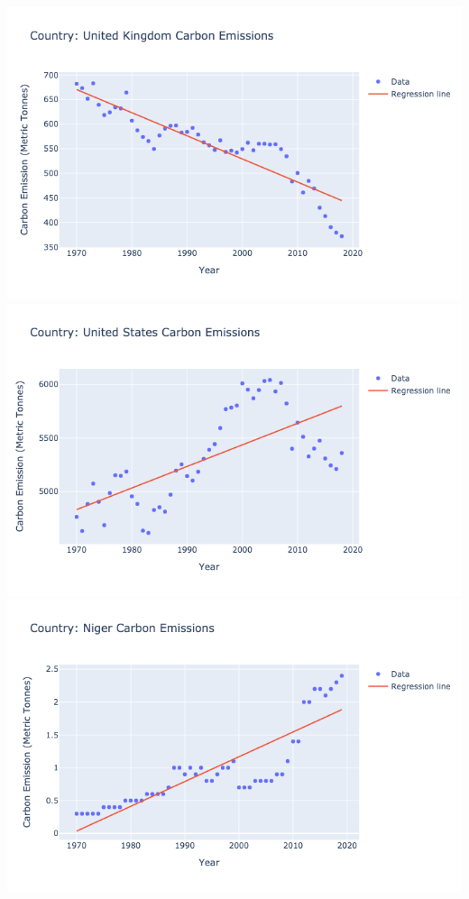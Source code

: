 \documentclass[fontsize=11pt]{article}
\begin{document}
    \includegraphics[scale=0.75]{uk_linear.png}
    \includegraphics[scale=0.75]{us_linear.png}
    \includegraphics[scale=0.75]{niger_linear.png}
\end{document}
